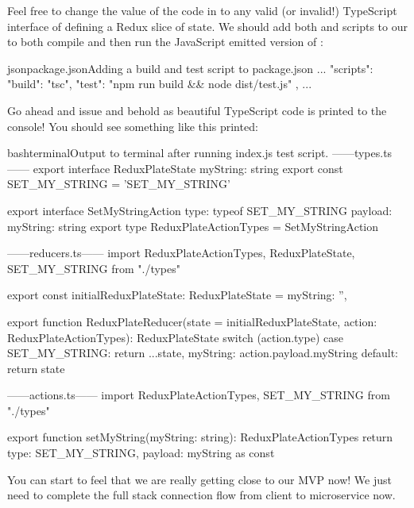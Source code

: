 \documentclass[a4paper,headinclude=on,footinclude=on,12pt,oneside]{scrbook}
\begin{document}
Feel free to change the value of the code in  to any valid (or invalid!) TypeScript interface of defining a Redux slice of state. We should add both  and  scripts to our  to both compile and then run the JavaScript emitted version of :

\begin{codeInput}{json}{package.json}{Adding a build and test script to package.json}
...
"scripts": {
  "build": "tsc",
  "test": "npm run build && node dist/test.js"
},
...
\end{codeInput}

Go ahead and issue  and behold as beautiful TypeScript code is printed to the console! You should see something like this printed:

\begin{codeInput}{bash}{terminal}{Output to terminal after running index.js test script.}
------types.ts------
export interface ReduxPlateState {
    myString: string
}
export const SET_MY_STRING = 'SET_MY_STRING'

export interface SetMyStringAction {
  type: typeof SET_MY_STRING
  payload: {
    myString: string
  }
}
export type ReduxPlateActionTypes = SetMyStringAction

------reducers.ts------
import { ReduxPlateActionTypes, ReduxPlateState, SET_MY_STRING } from "./types"

export const initialReduxPlateState: ReduxPlateState = {
  myString: '',
}

export function ReduxPlateReducer(state = initialReduxPlateState, action: ReduxPlateActionTypes): ReduxPlateState {
  switch (action.type) {
    case SET_MY_STRING:
      return {
        ...state,
        myString: action.payload.myString
      }
    default:
      return state
  }
}

------actions.ts------
import { ReduxPlateActionTypes, SET_MY_STRING } from "./types"

export function setMyString(myString: string): ReduxPlateActionTypes {
  return {
    type: SET_MY_STRING,
    payload: {
      myString
    }
  } as const
}
\end{codeInput}

You can start to feel that we are really getting close to our MVP now! \wink We just need to complete the full stack connection flow from client to microservice now.

\end{document}

